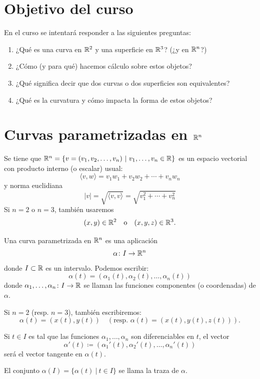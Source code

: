 \chapter{Objetivo del curso}


En el curso se intentará responder a las siguientes preguntas:
\begin{enumerate}
	\item ¿Qué es una curva en $\mathbb{R}^{2}$ y una superficie en $\mathbb{R}^{3}$? (¿y en $\mathbb{R}^{n}$?)

	\item ¿Cómo (y para qué) hacemos cálculo sobre estos objetos?

	\item ¿Qué significa decir que dos curvas o dos superficies son equivalentes?

	\item ¿Qué es la curvatura y cómo impacta la forma de estos objetos?
\end{enumerate}

\chapter{Curvas parametrizadas en $\mathbb{R}^{n}$}

Se tiene que $\mathbb{R}^{n} = \{ v = (v_{1}, v_{2}, \dots, v_{n}) \ | \ v_{1},\dots,v_{n} \in \mathbb{R} \}$ es un espacio vectorial con producto interno (o escalar) usual:
\[ \langle v, w \rangle = v_{1}w_{1} + v_{2}w_{2} + \cdots + v_{n}w_{n} \]
y norma euclidiana
\[ | v | = \sqrt{\langle v, v \rangle} = \sqrt{v_{1}^{2} + \cdots + v_{n}^{2}} \]
Si $n = 2$ o $n = 3$, también usaremos
\[ (x,y) \in \mathbb{R}^{2} \quad \text{o} \quad (x,y,z) \in \mathbb{R}^{3}. \]

\begin{definition}
	Una curva parametrizada en $\mathbb{R}^{n}$ es una aplicación
	\[ \alpha \colon I \to \mathbb{R}^{n} \]
	donde $I \subset \mathbb{R}$ es un intervalo. Podemos escribir:
	\[ \alpha(t) = (\alpha_{1}(t), \alpha_{2}(t), \dots, \alpha_{n}(t)) \]
	donde $\alpha_{1}, \dots, \alpha_{n} \colon I \to \mathbb{R}$ se llaman las funciones componentes (o coordenadas) de $\alpha$. \par
	Si $n = 2$ (resp. $n = 3$), también escribiremos:
	\[ \alpha(t) = (x(t), y(t)) \quad (\text{resp. } \alpha(t) = (x(t), y(t), z(t))). \]
	\par
	Si $t \in I$ es tal que las funciones $\alpha_{1},\dots,\alpha_{n}$ son diferenciables en $t$, el vector
	\[ \alpha'(t) \coloneq (\alpha_{1}'(t), \alpha_{2}'(t), \dots, \alpha_{n}'(t)) \]
	será el vector tangente en $\alpha(t)$. \par
	El conjunto $\alpha(I) = \{ \alpha(t) \ | \ t \in I \}$ se llama la traza de $\alpha$.
\end{definition}

